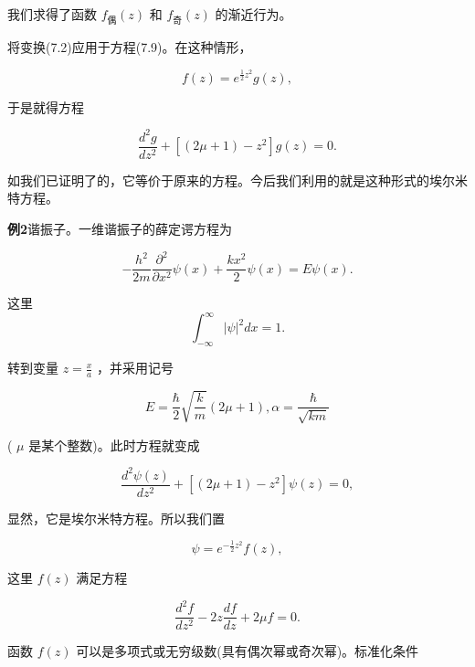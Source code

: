 我们求得了函数 $f_{\text{偶}}(z)$ 和 $f_{\text{奇}}(z)$ 的渐近行为。

将变换(7.2)应用于方程(7.9)。在这种情形，

\begin{equation*}
f (z) = e ^ {\frac {1}{2} z ^ {2}} g (z),
\end{equation*}

于是就得方程

\begin{equation*}
\frac {d ^ {2} g}{d z ^ {2}} + \left[ (2 \mu + 1) - z ^ {2} \right] g (z) = 0.
\end{equation*}

如我们已证明了的，它等价于原来的方程。今后我们利用的就是这种形式的埃尔米特方程。

\textbf{例2}\quad 谐振子。一维谐振子的薛定谔方程为

\begin{equation*}
- \frac {h ^ {2}}{2 m} \frac {\partial^ {2}}{\partial x ^ {2}} \psi (x) + \frac {k x ^ {2}}{2} \psi (x) = E \psi (x).
\end{equation*}

这里
\begin{equation*}
\int_ {- \infty} ^ {\infty} | \psi | ^ {2} d x = 1.
\end{equation*}

转到变量 $z = \frac{x}{a}$ ，并采用记号

\begin{equation*}
E = \frac {\hbar}{2} \sqrt {\frac {k}{m}} (2 \mu + 1), \alpha = \frac {\hbar}{\sqrt {k m}}
\end{equation*}

( $\mu$ 是某个整数)。此时方程就变成

\begin{equation*}
\frac {d ^ {2} \psi (z)}{d z ^ {2}} + [ (2 \mu + 1) - z ^ {2} ] \psi (z) = 0,
\end{equation*}

显然，它是埃尔米特方程。所以我们置

\begin{equation*}
\psi = e ^ {- \frac {1}{2} z ^ {2}} f (z),
\end{equation*}

这里 $f(z)$ 满足方程

\begin{equation*}
\frac {d ^ {2} f}{d z ^ {2}} - 2 z \frac {d f}{d z} + 2 \mu f = 0.
\end{equation*}

函数 $f(z)$ 可以是多项式或无穷级数(具有偶次幂或奇次幂)。标准化条件

